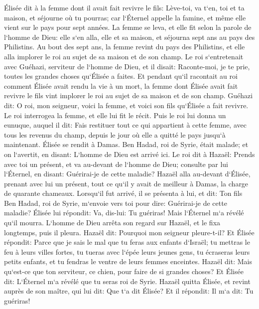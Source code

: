 \verse Élisée dit à la femme dont il avait fait revivre le fils: Lève-toi, va t`en, toi et ta maison, et séjourne où tu pourras; car l`Éternel appelle la famine, et même elle vient sur le pays pour sept années. 
\verse La femme se leva, et elle fit selon la parole de l`homme de Dieu: elle s`en alla, elle et sa maison, et séjourna sept ans au pays des Philistins. 
\verse Au bout des sept ans, la femme revint du pays des Philistins, et elle alla implorer le roi au sujet de sa maison et de son champ. 
\verse Le roi s`entretenait avec Guéhazi, serviteur de l`homme de Dieu, et il disait: Raconte-moi, je te prie, toutes les grandes choses qu`Élisée a faites. 
\verse Et pendant qu`il racontait au roi comment Élisée avait rendu la vie à un mort, la femme dont Élisée avait fait revivre le fils vint implorer le roi au sujet de sa maison et de son champ. Guéhazi dit: O roi, mon seigneur, voici la femme, et voici son fils qu`Élisée a fait revivre. 
\verse Le roi interrogea la femme, et elle lui fit le récit. Puis le roi lui donna un eunuque, auquel il dit: Fais restituer tout ce qui appartient à cette femme, avec tous les revenus du champ, depuis le jour où elle a quitté le pays jusqu`à maintenant. 
\verse Élisée se rendit à Damas. Ben Hadad, roi de Syrie, était malade; et on l`avertit, en disant: L`homme de Dieu est arrivé ici. 
\verse Le roi dit à Hazaël: Prends avec toi un présent, et va au-devant de l`homme de Dieu; consulte par lui l`Éternel, en disant: Guérirai-je de cette maladie? 
\verse Hazaël alla au-devant d`Élisée, prenant avec lui un présent, tout ce qu`il y avait de meilleur à Damas, la charge de quarante chameaux. Lorsqu`il fut arrivé, il se présenta à lui, et dit: Ton fils Ben Hadad, roi de Syrie, m`envoie vers toi pour dire: Guérirai-je de cette maladie? 
\verse Élisée lui répondit: Va, dis-lui: Tu guériras! Mais l`Éternel m`a révélé qu`il mourra. 
\verse L`homme de Dieu arrêta son regard sur Hazaël, et le fixa longtemps, puis il pleura. 
\verse Hazaël dit: Pourquoi mon seigneur pleure-t-il? Et Élisée répondit: Parce que je sais le mal que tu feras aux enfants d`Israël; tu mettras le feu à leurs villes fortes, tu tueras avec l`épée leurs jeunes gens, tu écraseras leurs petits enfants, et tu fendras le ventre de leurs femmes enceintes. 
\verse Hazaël dit: Mais qu`est-ce que ton serviteur, ce chien, pour faire de si grandes choses? Et Élisée dit: L`Éternel m`a révélé que tu seras roi de Syrie. 
\verse Hazaël quitta Élisée, et revint auprès de son maître, qui lui dit: Que t`a dit Élisée? Et il répondit: Il m`a dit: Tu guériras! 
